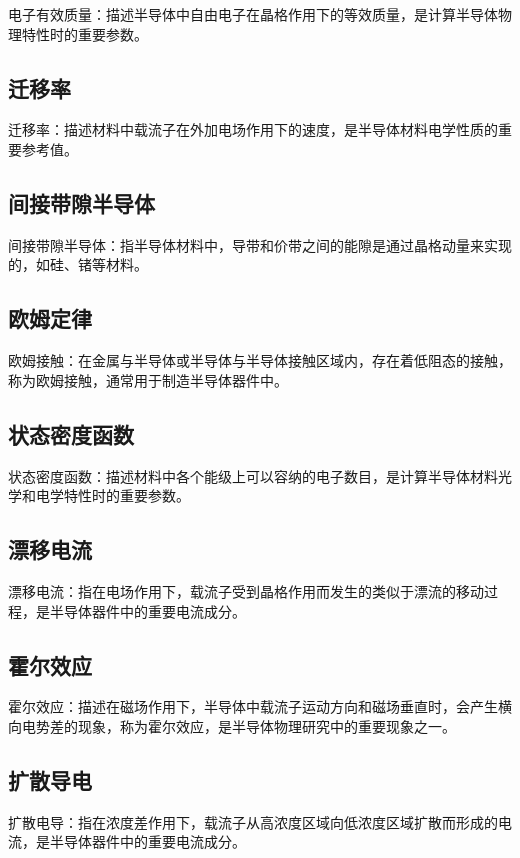 \documentclass{report}          %
\begin{document}
电子有效质量：描述半导体中自由电子在晶格作用下的等效质量，是计算半导体物理特性时的重要参数。

\subsection{迁移率}

迁移率：描述材料中载流子在外加电场作用下的速度，是半导体材料电学性质的重要参考值。

\subsection{间接带隙半导体}

间接带隙半导体：指半导体材料中，导带和价带之间的能隙是通过晶格动量来实现的，如硅、锗等材料。

\subsection{欧姆定律}

欧姆接触：在金属与半导体或半导体与半导体接触区域内，存在着低阻态的接触，称为欧姆接触，通常用于制造半导体器件中。

\subsection{状态密度函数}

状态密度函数：描述材料中各个能级上可以容纳的电子数目，是计算半导体材料光学和电学特性时的重要参数。

\subsection{漂移电流}

漂移电流：指在电场作用下，载流子受到晶格作用而发生的类似于漂流的移动过程，是半导体器件中的重要电流成分。

\subsection{霍尔效应}

霍尔效应：描述在磁场作用下，半导体中载流子运动方向和磁场垂直时，会产生横向电势差的现象，称为霍尔效应，是半导体物理研究中的重要现象之一。

\subsection{扩散导电}

扩散电导：指在浓度差作用下，载流子从高浓度区域向低浓度区域扩散而形成的电流，是半导体器件中的重要电流成分。
\end{document}
